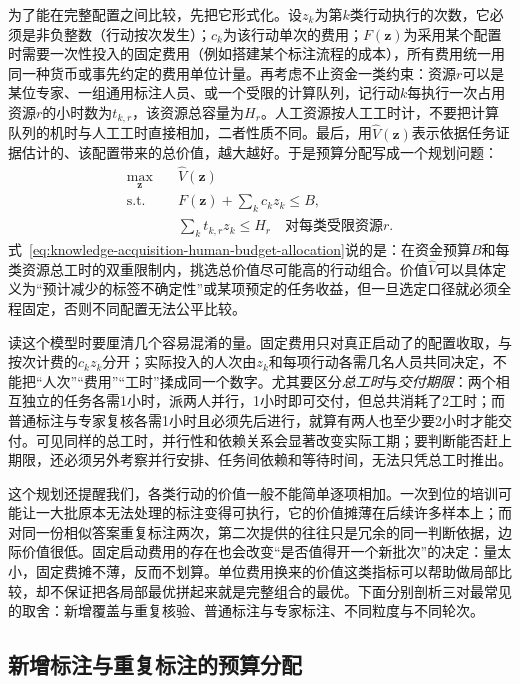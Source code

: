 为了能在完整配置之间比较，先把它形式化。设$z_k$为第$k$类行动执行的次数，它必须是非负整数（行动按次发生）；$c_k$为该行动单次的费用；$F(\bm{z})$为采用某个配置时需要一次性投入的固定费用（例如搭建某个标注流程的成本），所有费用统一用同一种货币或事先约定的费用单位计量。再考虑不止资金一类约束：资源$r$可以是某位专家、一组通用标注人员、或一个受限的计算队列，记行动$k$每执行一次占用资源$r$的小时数为$t_{k,r}$，该资源总容量为$H_r$。人工资源按人工工时计，不要把计算队列的机时与人工工时直接相加，二者性质不同。最后，用$\widehat V(\bm{z})$表示依据任务证据估计的、该配置带来的总价值，越大越好。于是预算分配写成一个规划问题：
\begin{equation}
  \begin{aligned}
    \max_{\bm{z}}\quad
      &\widehat V(\bm{z})\\
    \text{s.t.}\quad
      &F(\bm{z})+\sum_k c_k z_k\leq B,\\
      &\sum_k t_{k,r}z_k\leq H_r
      \quad\text{对每类受限资源$r$}.
  \end{aligned}
  \label{eq:knowledge-acquisition-human-budget-allocation}
\end{equation}
式~\eqref{eq:knowledge-acquisition-human-budget-allocation}说的是：在资金预算$B$和每类资源总工时的双重限制内，挑选总价值尽可能高的行动组合。价值$\widehat V$可以具体定义为“预计减少的标签不确定性”或某项预定的任务收益，但一旦选定口径就必须全程固定，否则不同配置无法公平比较。

读这个模型时要厘清几个容易混淆的量。固定费用只对真正启动了的配置收取，与按次计费的$c_kz_k$分开；实际投入的人次由$z_k$和每项行动各需几名人员共同决定，不能把“人次”“费用”“工时”揉成同一个数字。尤其要区分\emph{总工时}与\emph{交付期限}：两个相互独立的任务各需1小时，派两人并行，1小时即可交付，但总共消耗了2工时；而普通标注与专家复核各需1小时且必须先后进行，就算有两人也至少要2小时才能交付。可见同样的总工时，并行性和依赖关系会显著改变实际工期；要判断能否赶上期限，还必须另外考察并行安排、任务间依赖和等待时间，无法只凭总工时推出。

这个规划还提醒我们，各类行动的价值一般不能简单逐项相加。一次到位的培训可能让一大批原本无法处理的标注变得可执行，它的价值摊薄在后续许多样本上；而对同一份相似答案重复标注两次，第二次提供的往往只是冗余的同一判断依据，边际价值很低。固定启动费用的存在也会改变“是否值得开一个新批次”的决定：量太小，固定费摊不薄，反而不划算。单位费用换来的价值这类指标可以帮助做局部比较，却不保证把各局部最优拼起来就是完整组合的最优。下面分别剖析三对最常见的取舍：新增覆盖与重复核验、普通标注与专家标注、不同粒度与不同轮次。

\subsection{新增标注与重复标注的预算分配}
\label{sec:knowledge-acquisition-human-new-versus-repeat}

